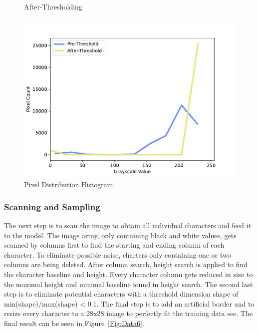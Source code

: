 \documentclass[@CLASSOPTIONS@]{tumarticle}
\begin{document}
\begin{figure}[!htb]
   \begin{minipage}{0.48\textwidth}
     \centering
     \caption{After-Thresholding}\label{Fig:Data4}
   \end{minipage}
  \hfill
   \begin{minipage}{0.48\textwidth}
     \centering
     \includegraphics[width=.9\linewidth]{figures/histogram}
     \caption{Pixel Distribution Histogram}\label{Fig:Data5}
   \end{minipage}
\end{figure}

\subsubsection{Scanning and Sampling}

The next step is to scan the image to obtain all individual characters and feed it to the model.
The image array, only containing black and white values, gets scanned by columns first to find the starting
and ending column of each character.
To eliminate possible noise, charters only containing one or two columns are being deleted.
After column search, height search is applied to find the character baseline and height.
Every character column gets reduced in size to the maximal height and minimal baseline found in height search.
The second last step is to eliminate potential characters with a threshold dimension shape of
min(shape)/max(shape) < 0.1.
The final step is to add an artificial border and to resize every character to a 28x28 image to
perfectly fit the training data see.
The final result can be seen in Figure~\ref{Fig:Data6}.
\end{document}
